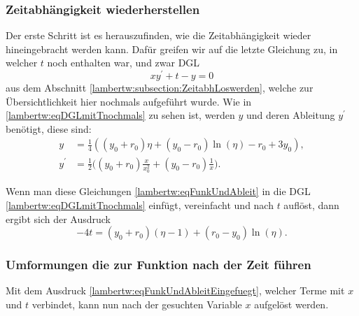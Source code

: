 \subsubsection{Zeitabhängigkeit wiederherstellen
	\label{lambertw:subsubsection:ZeitabhWiederherst}}
Der erste Schritt ist es herauszufinden, wie die Zeitabhängigkeit wieder hineingebracht werden kann. Dafür greifen wir auf die letzte Gleichung zu, in welcher \(t\) noch enthalten war, und zwar DGL 
\begin{equation}
	x y^{\prime} + t - y
	= 0
	\label{lambertw:eqDGLmitTnochmals}
\end{equation}
aus dem Abschnitt \eqref{lambertw:subsection:ZeitabhLoswerden}, welche zur Übersichtlichkeit hier nochmals aufgeführt wurde.
Wie in \eqref{lambertw:eqDGLmitTnochmals} zu sehen ist, werden \(y\) und deren Ableitung \(y^{\prime}\) benötigt, diese sind:
\begin{subequations}
	\label{lambertw:eqFunkUndAbleit}
	\begin{align}
		\label{lambertw:eqFunkUndAbleit1}
		y
		&=
		\frac{1}{4}\left(\left(y_0+r_0\right)\eta+\left(y_0-r_0\right)\operatorname{ln}\left(\eta\right)-r_0+3y_0\right), \\
		y^\prime
		&=
		\frac{1}{2}\biggl(\left(y_0+r_0\right)\frac{x}{x_0^2}+\left(y_0-r_0\right)\frac{1}{x}\biggr).
	\end{align}
\end{subequations}

Wenn man diese Gleichungen \eqref{lambertw:eqFunkUndAbleit} in die DGL \eqref{lambertw:eqDGLmitTnochmals} einfügt, vereinfacht und nach \(t\) auflöst, dann ergibt sich der Ausdruck
\begin{equation}
	-4t
	=
	\left(y_0+r_0\right)\left(\eta-1\right)+\left(r_0-y_0\right)\operatorname{ln}\left(\eta\right).
	\label{lambertw:eqFunkUndAbleitEingefuegt}
\end{equation}

\subsubsection{Umformungen die zur Funktion nach der Zeit führen
	\label{lambertw:subsubsection:UmformBisZumZiel}}
Mit dem Ausdruck \eqref{lambertw:eqFunkUndAbleitEingefuegt}, welcher Terme mit \(x\) und \(t\) verbindet, kann nun nach der gesuchten Variable \(x\) aufgelöst werden. 


